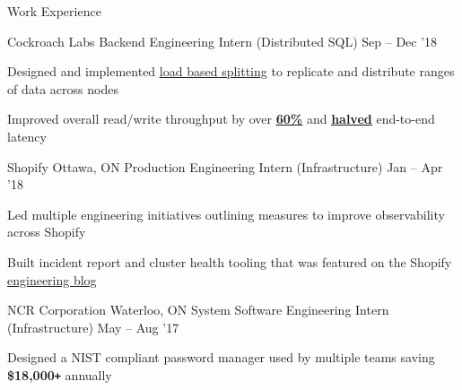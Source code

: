 \documentclass{resume} %
\begin{document}
\begin{rSection}{Work Experience}
\begin{rDualWorkSection}{Cockroach Labs}
{       %
    }
    {Backend Engineering Intern (Distributed SQL)}
    {Sep -- Dec '18}
    {
       \item Designed and implemented \href{https://github.com/cockroachdb/cockroach/pull/31413}
      {\underline{load based splitting}} to replicate
      and distribute ranges of data across nodes
    \item Improved overall read/write throughput by over
         \setul{4pt}{.4pt}
         \href{https://github.com/cockroachdb/cockroach/issues/31819}{\textbf{\ul{60\%}}}
         and
         \href{https://github.com/cockroachdb/cockroach/issues/31819}{\textbf{\ul{halved}}}
         end-to-end latency
    }
  \end{rDualWorkSection}

  \begin{rWorkSection}{Shopify}
		     {Ottawa, ON}
		     {Production Engineering Intern (Infrastructure)}
		     {Jan -- Apr '18}
    {
      \item Led multiple engineering initiatives outlining measures to improve
        observability across Shopify
      \item Built incident report and cluster health tooling that was featured on the Shopify 
        \href{https://engineering.shopify.com/blogs/engineering/implementing-chatops-into-our-incident-management-procedure}
        {\underline{engineering blog}}
    }
  \end{rWorkSection}

  \begin{rWorkSection}{NCR Corporation}
		     {Waterloo, ON}
		     {System Software Engineering Intern (Infrastructure)}
		     {May -- Aug '17}
    {
      \item Designed a NIST compliant password manager used by multiple teams
        saving \textbf{\$18,000\texttt{+}}
        annually
    }
  \end{rWorkSection}
\end{rSection} 

\end{document}
